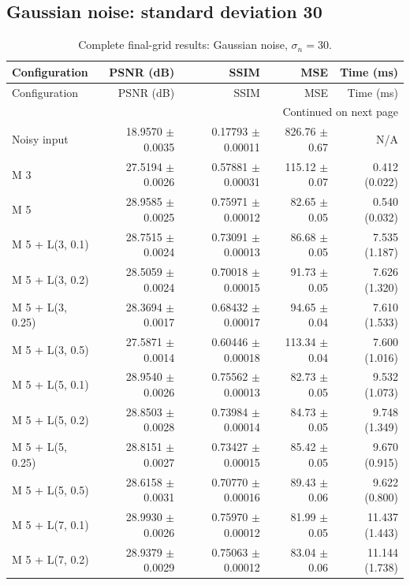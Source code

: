 \subsection{Gaussian noise: standard deviation 30}
\begingroup
\footnotesize
\setlength{\tabcolsep}{4pt}
\begin{longtable}{lrrrr}
\caption{Complete final-grid results: Gaussian noise, $\sigma_n=30$.}\\
\toprule Configuration & PSNR (dB) & SSIM & MSE & Time (ms) \\ \midrule
\endfirsthead
\toprule Configuration & PSNR (dB) & SSIM & MSE & Time (ms) \\ \midrule
\endhead
\midrule \multicolumn{5}{r}{Continued on next page}\\
\endfoot
\bottomrule
\endlastfoot
Noisy input & 18.9570 $\pm$ 0.0035 & 0.17793 $\pm$ 0.00011 & 826.76 $\pm$ 0.67 & N/A \\
M 3 & 27.5194 $\pm$ 0.0026 & 0.57881 $\pm$ 0.00031 & 115.12 $\pm$ 0.07 & 0.412 (0.022) \\
M 5 & 28.9585 $\pm$ 0.0025 & 0.75971 $\pm$ 0.00012 & 82.65 $\pm$ 0.05 & 0.540 (0.032) \\
M 5 + L(3, 0.1) & 28.7515 $\pm$ 0.0024 & 0.73091 $\pm$ 0.00013 & 86.68 $\pm$ 0.05 & 7.535 (1.187) \\
M 5 + L(3, 0.2) & 28.5059 $\pm$ 0.0024 & 0.70018 $\pm$ 0.00015 & 91.73 $\pm$ 0.05 & 7.626 (1.320) \\
M 5 + L(3, 0.25) & 28.3694 $\pm$ 0.0017 & 0.68432 $\pm$ 0.00017 & 94.65 $\pm$ 0.04 & 7.610 (1.533) \\
M 5 + L(3, 0.5) & 27.5871 $\pm$ 0.0014 & 0.60446 $\pm$ 0.00018 & 113.34 $\pm$ 0.04 & 7.600 (1.016) \\
M 5 + L(5, 0.1) & 28.9540 $\pm$ 0.0026 & 0.75562 $\pm$ 0.00013 & 82.73 $\pm$ 0.05 & 9.532 (1.073) \\
M 5 + L(5, 0.2) & 28.8503 $\pm$ 0.0028 & 0.73984 $\pm$ 0.00014 & 84.73 $\pm$ 0.05 & 9.748 (1.349) \\
M 5 + L(5, 0.25) & 28.8151 $\pm$ 0.0027 & 0.73427 $\pm$ 0.00015 & 85.42 $\pm$ 0.05 & 9.670 (0.915) \\
M 5 + L(5, 0.5) & 28.6158 $\pm$ 0.0031 & 0.70770 $\pm$ 0.00016 & 89.43 $\pm$ 0.06 & 9.622 (0.800) \\
M 5 + L(7, 0.1) & 28.9930 $\pm$ 0.0026 & 0.75970 $\pm$ 0.00012 & 81.99 $\pm$ 0.05 & 11.437 (1.443) \\
M 5 + L(7, 0.2) & 28.9379 $\pm$ 0.0029 & 0.75063 $\pm$ 0.00012 & 83.04 $\pm$ 0.06 & 11.144 (1.738) \\

\end{longtable}

